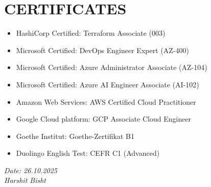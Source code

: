 \documentclass[11pt,a4paper]{article}
\newenvironment{dashlist}{
  \begin{itemize}[label={--}]
}{
  \end{itemize}
}
\begin{document}

\section*{CERTIFICATES}
\begin{itemize}
    \item HashiCorp Certified: Terraform Associate (003)
    \item Microsoft Certified: DevOps Engineer Expert (AZ-400)
    \item Microsoft Certified: Azure Administrator Associate (AZ-104)
    \item Microsoft Certified: Azure AI Engineer Associate (AI-102)
    \item Amazon Web Services: AWS Certified Cloud Practitioner
    \item Google Cloud platform: GCP Associate Cloud Engineer
    \item Goethe Institut: Goethe-Zertifikat B1
    \item Duolingo English Test: CEFR C1 (Advanced)
\end{itemize}


\vfill %
\noindent %
\begin{flushright} %
    \textit{Date: 26.10.2025}\\ %
    \textit{Harshit Bisht} %
\end{flushright}
\end{document}
